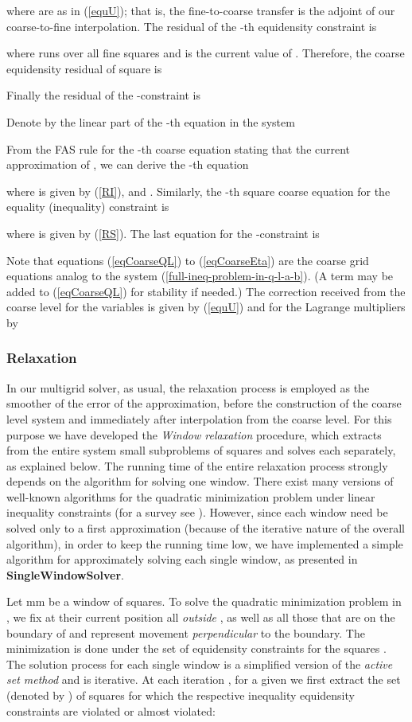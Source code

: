 \documentclass[final]{siamltex}
\begin{document}
where
 are as in (\ref{equU}); that is, the fine-to-coarse
transfer is the adjoint of our coarse-to-fine interpolation. The
residual of the -th equidensity constraint is

where  runs over all fine squares and  is the
current value of . Therefore, the coarse equidensity
residual of square  is

Finally the residual of the -constraint is


Denote by  the linear part of the -th equation in
the system 

From the FAS rule for the -th coarse equation stating that
 the current approximation of , we can
derive the -th  equation

where  is given by (\ref{RI}),  and
.
Similarly, the -th square coarse equation for the equality
(inequality) constraint is

where  is given by (\ref{RS}).
The last equation for the -constraint is

Note that equations (\ref{eqCoarseQL}) to (\ref{eqCoarseEta}) are
the coarse grid equations analog to the system
(\ref{full-ineq-problem-in-q-l-a-b}). (A  term may
be added to (\ref{eqCoarseQL}) for stability if needed.) The
correction received from the coarse level for the  variables
is given by (\ref{equU}) and for the Lagrange multipliers
 by

\subsubsection{Relaxation}\label{sRelax}
\par In our multigrid solver, as usual, the relaxation process is employed
as the smoother of the error of the approximation, before the
construction of the coarse level system and immediately
after interpolation from the coarse level. For this purpose we
have developed the {\it Window relaxation} procedure,
which extracts from the entire system small subproblems of
 squares and solves each separately, as explained
below. The running time of the entire relaxation process strongly
depends on the algorithm for solving one window. There exist many
 versions of well-known algorithms for the quadratic
minimization problem under linear inequality constraints (for a
survey see \cite{avriel}). However, since each window need be
solved only to a first approximation (because of the iterative nature
of the overall algorithm), in order to keep the running time low,
we have implemented a simple algorithm for approximately solving
each single window, as presented in {\bf SingleWindowSolver}.
\par Let
m\times m be a window of squares.
To solve the quadratic minimization problem in , we
fix at their current position all  {\it outside} , as
well as all those that are on the boundary of  and
represent movement {\it perpendicular} to the boundary.
The minimization is done under the set of equidensity constraints
for the squares .
The solution process for each single window is a simplified
version of the {\it active set method} and is iterative. At
each iteration , for a given  we first extract the
set (denoted by ) of squares for which the respective
inequality equidensity constraints are violated or almost
violated:
\end{document}
